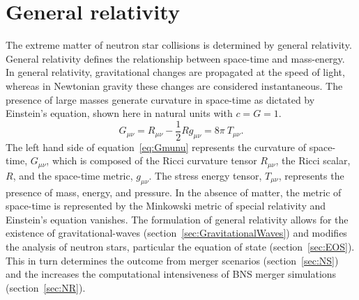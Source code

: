 \section{General relativity}
The extreme matter of neutron star collisions is determined by general relativity. General relativity defines the relationship between space-time and mass-energy. In general relativity, gravitational changes are propagated at the speed of light, whereas in Newtonian gravity these changes are considered instantaneous. The presence of large masses generate curvature in space-time as dictated by Einstein's equation, shown here in natural units with $c = G =1$.
\begin{equation}
G_{\mu\nu}=R_{\mu\nu}-\dfrac{1}{2}R g_{\mu\nu}=8\pi \ T_{\mu\nu}.
\label{eq:Gmunu}
\end{equation}
The left hand side of equation~\ref{eq:Gmunu} represents the curvature of space-time, $G_{\mu\nu}$, which is composed of the Ricci curvature tensor $R_{\mu\nu}$, the Ricci scalar, $R$, and the space-time metric, $g_{\mu\nu}$.  The stress energy tensor, $T_{\mu\nu}$, represents the presence of mass, energy, and pressure. In the absence of matter, the metric of space-time is represented by the Minkowski metric of special relativity and Einstein's equation vanishes. The formulation of general relativity allows for the existence of gravitational-waves (section~\ref{sec:GravitationalWaves}) and modifies the analysis of neutron stars, particular the equation of state (section~\ref{sec:EOS}). This in turn determines the outcome from merger scenarios (section~\ref{sec:NS}) and the increases the computational intensiveness of BNS merger simulations (section~\ref{sec:NR}).
